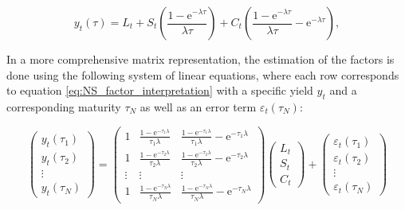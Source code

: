 \begin{equation}
\label{eq:NS_factor_interpretation}
    y_{t}(\tau)=L_{t}+S_{t}\left(\frac{1-\mathrm{e}^{-\lambda \tau}}{\lambda \tau}\right)+C_{t}\left(\frac{1-\mathrm{e}^{-\lambda \tau}}{\lambda \tau}-\mathrm{e}^{-\lambda \tau}\right),
\end{equation}

In a more comprehensive matrix representation, the estimation of the factors is done using the following system of linear equations, where each row corresponds to equation \ref{eq:NS_factor_interpretation} with a specific yield $y_{t}$ and a corresponding maturity $\tau_{N}$ as well as an error term $\varepsilon_{t}(\tau_{N})$:

\begin{equation}
\left(\begin{array}{c}
y_t\left(\tau_1\right) \\
y_t\left(\tau_2\right) \\
\vdots \\
y_t\left(\tau_N\right)
\end{array}\right)=\left(\begin{array}{ccc}
1 & \frac{1-\mathrm{e}^{-\tau_1 \lambda}}{\tau_1 \lambda} & \frac{1-\mathrm{e}^{-\tau_1 \lambda}}{\tau_1 \lambda}-\mathrm{e}^{-\tau_1 \lambda} \\
1 & \frac{1-\mathrm{e}^{-\tau_2 \lambda}}{\tau_2 \lambda} & \frac{1-\mathrm{e}^{-\tau_2 \lambda}}{\tau_2 \lambda}-\mathrm{e}^{-\tau_2 \lambda} \\
\vdots & \vdots & \vdots \\
1 & \frac{1-\mathrm{e}^{-\tau_N \lambda}}{\tau_N \lambda} & \frac{1-\mathrm{e}^{-\tau_N \lambda}}{\tau_N \lambda}-\mathrm{e}^{-\tau_N \lambda}
\end{array}\right)\left(\begin{array}{c}
L_t \\
S_t \\
C_t
\end{array}\right)+\left(\begin{array}{c}
\varepsilon_t\left(\tau_1\right) \\
\varepsilon_t\left(\tau_2\right) \\
\vdots \\
\varepsilon_t\left(\tau_N\right)
\end{array}\right)
\end{equation}

